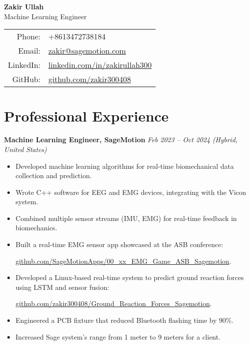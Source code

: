 \documentclass[10pt,a4paper]{article}
\begin{document}
	
	\begin{center}
		{\LARGE \textbf{Zakir Ullah}} \\
		\vspace{0.2cm}
		Machine Learning Engineer \\
		\vspace{0.2cm}
		\begin{tabular}{rl}
			Phone: & +8613472738184 \\
			Email: & \href{mailto:zakir@sagemotion.com}{zakir@sagemotion.com} \\
			LinkedIn: & \href{https://www.linkedin.com/in/zakirullah300}{linkedin.com/in/zakirullah300} \\
			GitHub: & \href{https://github.com/zakir300408}{github.com/zakir300408}
		\end{tabular}
	\end{center}
	
	\vspace{0.5cm}
	
	\section{Professional Experience}
	
	\textbf{Machine Learning Engineer, SageMotion} \hfill \textit{Feb 2023 -- Oct 2024 (Hybrid, United States)} \\
	\begin{itemize}[left=0pt, nosep]
		\item Developed machine learning algorithms for real-time biomechanical data collection and prediction.
		\item Wrote C++ software for EEG and EMG devices, integrating with the Vicon system.
		\item Combined multiple sensor streams (IMU, EMG) for real-time feedback in biomechanics.
		\item Built a real-time EMG sensor app showcased at the ASB conference:
		
		 \href{https://github.com/SageMotionApps/00_xx_EMG_Game_ASB_Sagemotion}{github.com/SageMotionApps/00\_xx\_EMG\_Game\_ASB\_Sagemotion}.
		\item Developed a Linux-based real-time system to predict ground reaction forces using LSTM and sensor fusion:
		
		 \href{https://github.com/zakir300408/Ground_Reaction_Forces_Sagemotion}{github.com/zakir300408/Ground\_Reaction\_Forces\_Sagemotion}.
		\item Engineered a PCB fixture that reduced Bluetooth flashing time by 90\%.
		\item Increased Sage system's range from 1 meter to 9 meters for a client.
	\end{itemize}
	
\end{document}
